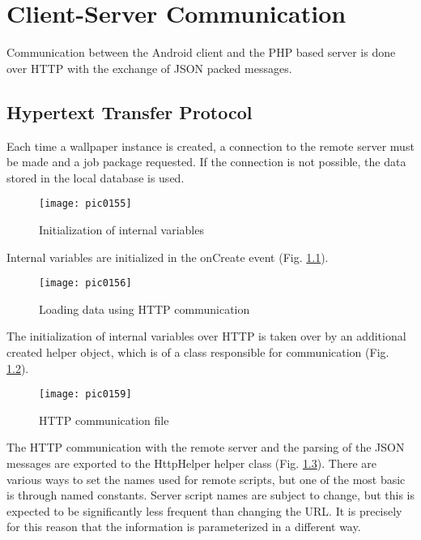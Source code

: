 \newpage
\chapter{Client-Server Communication}
\label{chapter06}

Communication between the Android client and the PHP based server is done over HTTP with the exchange of JSON packed messages.

\section{Hypertext Transfer Protocol}

Each time a wallpaper instance is created, a connection to the remote server must be made and a job package requested. If the connection is not possible, the data stored in the local database is used.

\begin{figure}[h]
\centering
\texttt{[image: pic0155]}
\caption{Initialization of internal variables}
\label{fig:pic0155}
\end{figure}
\FloatBarrier

Internal variables are initialized in the onCreate event (Fig. \ref{fig:pic0155}).

\begin{figure}[h]
\centering
\texttt{[image: pic0156]}
\caption{Loading data using HTTP communication}
\label{fig:pic0156}
\end{figure}
\FloatBarrier

The initialization of internal variables over HTTP is taken over by an additional created helper object, which is of a class responsible for communication (Fig. \ref{fig:pic0156}).

\begin{figure}[h]
\centering
\texttt{[image: pic0159]}
\caption{HTTP communication file}
\label{fig:pic0159}
\end{figure}
\FloatBarrier

The HTTP communication with the remote server and the parsing of the JSON messages are exported to the HttpHelper helper class (Fig. \ref{fig:pic0159}). There are various ways to set the names used for remote scripts, but one of the most basic is through named constants. Server script names are subject to change, but this is expected to be significantly less frequent than changing the URL. It is precisely for this reason that the information is parameterized in a different way.

